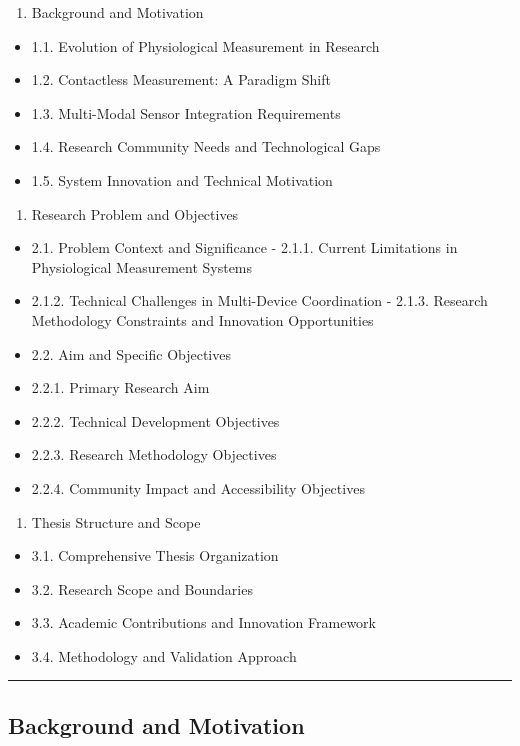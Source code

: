 \documentclass[11pt,a4paper]{report}
\begin{document}
\begin{enumerate}
\item Background and Motivation
\end{enumerate}
\begin{itemize}
\item 1.1. Evolution of Physiological Measurement in Research
\item 1.2. Contactless Measurement: A Paradigm Shift
\item 1.3. Multi-Modal Sensor Integration Requirements
\item 1.4. Research Community Needs and Technological Gaps
\item 1.5. System Innovation and Technical Motivation
\end{itemize}
\begin{enumerate}
\item Research Problem and Objectives
\end{enumerate}
\begin{itemize}
\item 2.1. Problem Context and Significance
        -
        2.1.1. Current Limitations in Physiological Measurement Systems
\item 2.1.2. Technical Challenges in Multi-Device Coordination
        -
        2.1.3. Research Methodology Constraints and Innovation Opportunities
\item 2.2. Aim and Specific Objectives
\item 2.2.1. Primary Research Aim
\item 2.2.2. Technical Development Objectives
\item 2.2.3. Research Methodology Objectives
\item 2.2.4. Community Impact and Accessibility Objectives
\end{itemize}
\begin{enumerate}
\item Thesis Structure and Scope
\end{enumerate}
\begin{itemize}
\item 3.1. Comprehensive Thesis Organization
\item 3.2. Research Scope and Boundaries
\item 3.3. Academic Contributions and Innovation Framework
\item 3.4. Methodology and Validation Approach

\end{itemize}
\hrule

\subsection{Background and Motivation}
\end{document}

